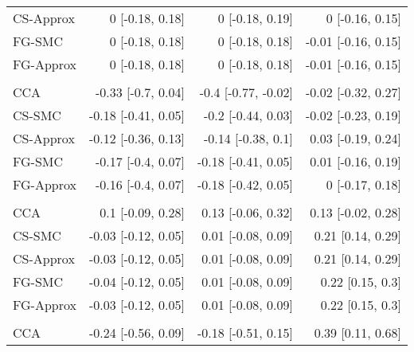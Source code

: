 \documentclass[
  12pt,
  a4paper,
]{article}
\begin{document}
\begin{longtable}[t]{lrrr}
\hspace{1em}CS-Approx & 0 [-0.18, 0.18] & 0 [-0.18, 0.19] & 0 [-0.16, 0.15]\\
\hspace{1em}FG-SMC & 0 [-0.18, 0.18] & 0 [-0.18, 0.18] & -0.01 [-0.16, 0.15]\\
\hspace{1em}FG-Approx & 0 [-0.18, 0.18] & 0 [-0.18, 0.18] & -0.01 [-0.16, 0.15]\\
\addlinespace[0.3em]
\multicolumn{4}{l}{\textbf{Night sweats: yes}}\\
\hspace{1em}CCA & -0.33 [-0.7, 0.04] & -0.4 [-0.77, -0.02] & -0.02 [-0.32, 0.27]\\
\hspace{1em}CS-SMC & -0.18 [-0.41, 0.05] & -0.2 [-0.44, 0.03] & -0.02 [-0.23, 0.19]\\
\hspace{1em}CS-Approx & -0.12 [-0.36, 0.13] & -0.14 [-0.38, 0.1] & 0.03 [-0.19, 0.24]\\
\hspace{1em}FG-SMC & -0.17 [-0.4, 0.07] & -0.18 [-0.41, 0.05] & 0.01 [-0.16, 0.19]\\
\hspace{1em}FG-Approx & -0.16 [-0.4, 0.07] & -0.18 [-0.42, 0.05] & 0 [-0.17, 0.18]\\
\addlinespace[0.3em]
\multicolumn{4}{l}{\textbf{Patient age (decades)}}\\
\hspace{1em}CCA & 0.1 [-0.09, 0.28] & 0.13 [-0.06, 0.32] & 0.13 [-0.02, 0.28]\\
\hspace{1em}CS-SMC & -0.03 [-0.12, 0.05] & 0.01 [-0.08, 0.09] & 0.21 [0.14, 0.29]\\
\hspace{1em}CS-Approx & -0.03 [-0.12, 0.05] & 0.01 [-0.08, 0.09] & 0.21 [0.14, 0.29]\\
\hspace{1em}FG-SMC & -0.04 [-0.12, 0.05] & 0.01 [-0.08, 0.09] & 0.22 [0.15, 0.3]\\
\hspace{1em}FG-Approx & -0.03 [-0.12, 0.05] & 0.01 [-0.08, 0.09] & 0.22 [0.15, 0.3]\\
\addlinespace[0.3em]
\multicolumn{4}{l}{\textbf{Patient sex: male}}\\
\hspace{1em}CCA & -0.24 [-0.56, 0.09] & -0.18 [-0.51, 0.15] & 0.39 [0.11, 0.68]\\

\end{longtable}
\end{document}
